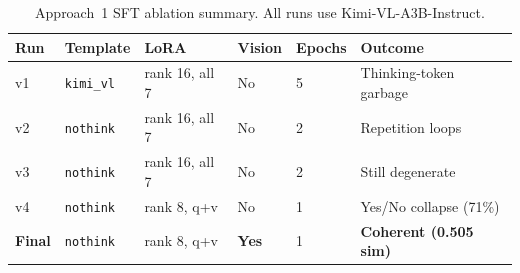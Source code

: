 \documentclass{article}
\begin{document}
\begin{table}[H]
\centering
\caption{Approach~1 SFT ablation summary. All runs use Kimi-VL-A3B-Instruct.}
\label{tab:ablations}
\small
\begin{tabular}{llllll}
\toprule
\textbf{Run} & \textbf{Template} & \textbf{LoRA} & \textbf{Vision} & \textbf{Epochs} & \textbf{Outcome} \\
\midrule
v1 & \texttt{kimi\_vl} & rank 16, all 7 & No & 5 & Thinking-token garbage \\
v2 & \texttt{nothink} & rank 16, all 7 & No & 2 & Repetition loops \\
v3 & \texttt{nothink} & rank 16, all 7 & No & 2 & Still degenerate \\
v4 & \texttt{nothink} & rank 8, q+v & No & 1 & Yes/No collapse (71\%) \\
\textbf{Final} & \texttt{nothink} & rank 8, q+v & \textbf{Yes} & 1 & \textbf{Coherent (0.505 sim)} \\
\bottomrule
\end{tabular}
\end{table}
 
\end{document}
